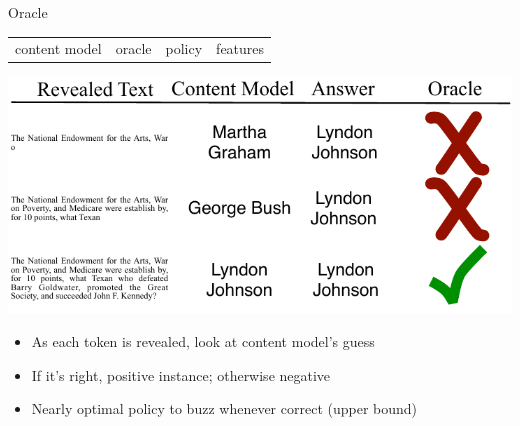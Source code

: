 \begin{frame}{Oracle}
\begin{block}{}
  \begin{center}
    \vspace{-.5cm}
    \begin{tabular}{cccc}
      content model & \alert{oracle} & policy & features \\
    \end{tabular}
    \vspace{-.5cm}
  \end{center}
\end{block}
\begin{center}
  \includegraphics[width=0.8\linewidth]{qb/oracle}
\end{center}

\begin{itemize}
  \item As each token is revealed, look at content model's guess
    \item If it's right, positive instance; otherwise negative
      \item Nearly optimal policy to buzz whenever correct (upper bound)
\end{itemize}

\end{frame}

